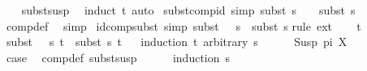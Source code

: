 \begin{isabellebody}
%
\isadelimproof
\ \ %
\endisadelimproof
%
\isatagproof
{}\isamarkupfalse%
\ subst{\isacharunderscore}{\kern0pt}susp\ \isamarkupfalse%
\ {\isacharparenleft}{\kern0pt}induct\ t{\isacharparenright}{\kern0pt}\ auto%
\endisatagproof
{\isafoldproof}%
%
\isadelimproof
\isanewline
%
\endisadelimproof
\isanewline
{}\isamarkupfalse%
\ subst{\isacharunderscore}{\kern0pt}comp{\isacharunderscore}{\kern0pt}id\ {\isacharbrackleft}{\kern0pt}simp{\isacharbrackright}{\kern0pt}{\isacharcolon}{\kern0pt}\ {\isachardoublequoteopen}subst\ {\isacharparenleft}{\kern0pt}s\ {\isasymbullet}\ {\isacharbrackleft}{\kern0pt}{\isacharbrackright}{\kern0pt}{\isacharparenright}{\kern0pt}\ {\isacharequal}{\kern0pt}\ subst\ s{\isachardoublequoteclose}\isanewline
%
\isadelimproof
\ \ %
\endisadelimproof
%
\isatagproof
{}\isamarkupfalse%
\ comp{\isacharunderscore}{\kern0pt}def\ \isamarkupfalse%
\ simp%
\endisatagproof
{\isafoldproof}%
%
\isadelimproof
\isanewline
%
\endisadelimproof
\isanewline
{}\isamarkupfalse%
\ id{\isacharunderscore}{\kern0pt}comp{\isacharunderscore}{\kern0pt}subst\ {\isacharbrackleft}{\kern0pt}simp{\isacharbrackright}{\kern0pt}{\isacharcolon}{\kern0pt}\ {\isachardoublequoteopen}subst\ {\isacharparenleft}{\kern0pt}{\isacharbrackleft}{\kern0pt}{\isacharbrackright}{\kern0pt}\ {\isasymbullet}\ s{\isacharparenright}{\kern0pt}\ {\isacharequal}{\kern0pt}\ subst\ s{\isachardoublequoteclose}\isanewline
%
\isadelimproof
%
\endisadelimproof
%
\isatagproof
{}\isamarkupfalse%
{\isacharparenleft}{\kern0pt}rule\ ext{\isacharparenright}{\kern0pt}\isanewline
\ \ \isamarkupfalse%
\ t\isanewline
\ \ \isamarkupfalse%
\ {\isachardoublequoteopen}subst\ {\isacharparenleft}{\kern0pt}{\isacharbrackleft}{\kern0pt}{\isacharbrackright}{\kern0pt}\ {\isasymbullet}\ s{\isacharparenright}{\kern0pt}\ t\ {\isacharequal}{\kern0pt}\ subst\ s\ t{\isachardoublequoteclose}\isanewline
\ \ \isamarkupfalse%
{\isacharparenleft}{\kern0pt}induction\ t\ arbitrary{\isacharcolon}{\kern0pt}\ s{\isacharparenright}{\kern0pt}\isanewline
\ \ \ \ \isamarkupfalse%
\ {\isacharparenleft}{\kern0pt}Susp\ pi\ X{\isacharparenright}{\kern0pt}\isanewline
\ \ \ \ \isamarkupfalse%
\ \isamarkupfalse%
\ {\isacharquery}{\kern0pt}case\ \isamarkupfalse%
\ comp{\isacharunderscore}{\kern0pt}def\ subst{\isacharunderscore}{\kern0pt}susp\isanewline
\ \ \ \ \isamarkupfalse%
\ {\isacharparenleft}{\kern0pt}induction\ s{\isacharparenright}{\kern0pt}\isanewline

\end{isabellebody}
